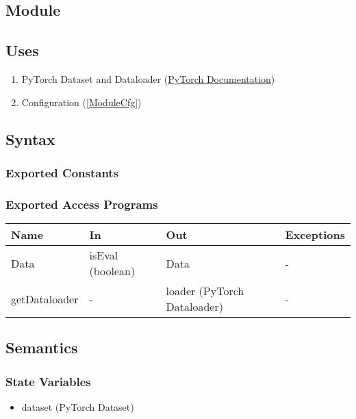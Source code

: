 \documentclass[12pt, titlepage]{article}
\begin{document}
\subsection{Module}



\subsection{Uses}
\begin{enumerate}
  \item PyTorch Dataset and Dataloader (\href{https://pytorch.org/tutorials/beginner/basics/data_tutorial.html}{PyTorch Documentation})
  \item Configuration (\ref{ModuleCfg})
\end{enumerate}

\subsection{Syntax}



\subsubsection{Exported Constants}



\subsubsection{Exported Access Programs}

\begin{center}
\begin{tabular}{p{3cm}|p{5cm}|p{4cm}|p{2cm}}
\hline
\textbf{Name} & \textbf{In} & \textbf{Out} & \textbf{Exceptions} \\
\hline
Data & isEval (boolean) & Data & - \\
\hline
getDataloader & - & loader (PyTorch Dataloader) & -  \\
\hline
\end{tabular}
\end{center}

\subsection{Semantics}

\subsubsection{State Variables}
\begin{itemize}
  \item dataset (PyTorch Dataset)
\end{itemize}
\end{document}

